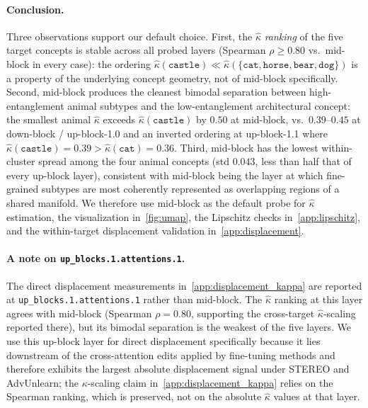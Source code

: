 \paragraph{Conclusion.} Three observations support our default choice. First, the $\hat\kappa$ \emph{ranking} of the five target concepts is stable across all probed layers (Spearman $\rho \geq 0.80$ vs.\ mid-block in every case): the ordering $\hat\kappa(\texttt{castle}) \ll \hat\kappa(\{\texttt{cat}, \texttt{horse}, \texttt{bear}, \texttt{dog}\})$ is a property of the underlying concept geometry, not of mid-block specifically. Second, mid-block produces the cleanest bimodal separation between high-entanglement animal subtypes and the low-entanglement architectural concept: the smallest animal $\hat\kappa$ exceeds $\hat\kappa(\texttt{castle})$ by $0.50$ at mid-block, vs.\ $0.39$--$0.45$ at down-block / up-block-1.0 and an inverted ordering at up-block-1.1 where $\hat\kappa(\texttt{castle}) = 0.39 > \hat\kappa(\texttt{cat}) = 0.36$. Third, mid-block has the lowest within-cluster spread among the four animal concepts (std $0.043$, less than half that of every up-block layer), consistent with mid-block being the layer at which fine-grained subtypes are most coherently represented as overlapping regions of a shared manifold. We therefore use mid-block as the default probe for $\hat\kappa$ estimation, the visualization in~\cref{fig:umap}, the Lipschitz checks in~\cref{app:lipschitz}, and the within-target displacement validation in~\cref{app:displacement}.

\paragraph{A note on \texttt{up\_blocks.1.attentions.1}.} The direct displacement measurements in~\cref{app:displacement_kappa} are reported at \texttt{up\_blocks.1.attentions.1} rather than mid-block. The $\hat\kappa$ ranking at this layer agrees with mid-block (Spearman $\rho = 0.80$, supporting the cross-target $\hat\kappa$-scaling reported there), but its bimodal separation is the weakest of the five layers. We use this up-block layer for direct displacement specifically because it lies downstream of the cross-attention edits applied by fine-tuning methods and therefore exhibits the largest absolute displacement signal under STEREO and AdvUnlearn; the $\kappa$-scaling claim in~\cref{app:displacement_kappa} relies on the Spearman ranking, which is preserved, not on the absolute $\hat\kappa$ values at that layer.